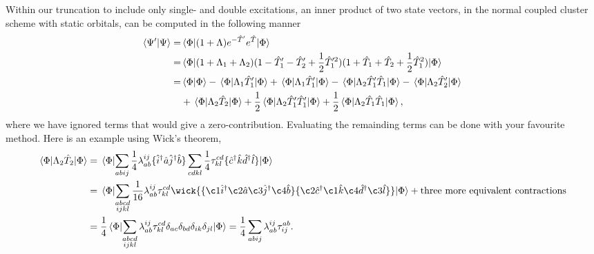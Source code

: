     Within our truncation to include only single- and double excitations,
    an inner product of two state vectors, in the normal coupled cluster scheme
    with static orbitals, can be computed in the following manner
    \begin{equation}
        \label{eq:inner_product_td_overlap}
        \begin{aligned}
            \braket{\Psi'}{\Psi} 
            =& \mel{\Phi}
            {
                (1 + \Lambda)e^{-\hat{T}'} e^{\hat{T}}
            }
            {\Phi} \\
            =&
            \mel{\Phi}{
            (1 + \Lambda_1 + \Lambda_2)
            (1 - \hat{T}'_1 - \hat{T}'_2 + \frac{1}{2}\hat{T}'^2_1) 
            (1 + \hat{T}_1 + \hat{T}_2 + \frac{1}{2}\hat{T}^2_1)
            }{\Phi} \\
            =& \braket{\Phi} - \mel{\Phi}{\Lambda_1\hat{T}'_1}{\Phi} 
                + \mel{\Phi}{\Lambda_1\hat{T}'_1}{\Phi}
                - \mel{\Phi}{\Lambda_2\hat{T}'_1\hat{T}_1}{\Phi}
                - \mel{\Phi}{\Lambda_2\hat{T}'_2}{\Phi} \\
            \ & + \mel{\Phi}{\Lambda_2\hat{T}_2}{\Phi}
                + \frac{1}{2}\mel{\Phi}{\Lambda_2\hat{T}'_1\hat{T}'_1}{\Phi}
                + \frac{1}{2}\mel{\Phi}{\Lambda_2\hat{T}_1\hat{T}_1}{\Phi},
        \end{aligned}
    \end{equation}
    where we have ignored terms that would give a zero-contribution.
    Evaluating the remainding terms can be done with your 
    favourite method. Here is an example using Wick's theorem,
    \begin{equation}
        \begin{aligned}
            \mel{\Phi}{\Lambda_2\hat{T}_2}{\Phi} 
            &= \mel{\Phi} 
            {
            \sum_{abij} \frac{1}{4}\lambda^{ij}_{ab}
                \{\hat{i}^\dagger \hat{a} \hat{j}^\dagger \hat{b} \}
            \sum_{cdkl} \frac{1}{4}\tau^{cd}_{kl}
                \{\hat{c}^\dagger \hat{k} \hat{d}^\dagger \hat{l} \}           
            } 
            {\Phi} \\
            &= \mel{\Phi} 
            {
            \sum_{\substack{abcd\\ijkl}} \frac{1}{16}\lambda^{ij}_{ab} \tau^{cd}_{kl}
                \wick{
                \{\c1{\hat{i}^\dagger} \c2{\hat{a}} \c3{\hat{j}^\dagger} \c4{\hat{b}} \}
                \{\c2{\hat{c}^\dagger} \c1{\hat{k}} \c4{\hat{d}^\dagger} \c3{\hat{l}} \}
                } 
            } 
            {\Phi}  + \text{three more equivalent contractions} \\
            &= 
            \frac{1}{4} \mel{\Phi} 
            {
                \sum_{\substack{abcd \\ ijkl}} \lambda^{ij}_{ab} \tau^{cd}_{kl} 
                \delta_{ac} 
                \delta_{bd}
                \delta_{ik} 
                \delta_{jl}
            } {\Phi}
            = \frac{1}{4} \sum_{abij} \lambda^{ij}_{ab} \tau^{ab}_{ij}.
        \end{aligned}
    \end{equation}

